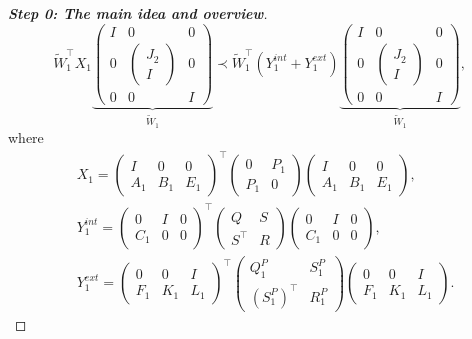 \documentclass[11pt,a4paper,oneside,DIV=12,headings=small]{scrartcl}
\theoremstyle{plain}
\begin{document}
\begin{proof}[\textbf{Step 0: \textit{The main idea and overview}}]
\begin{equation}
\label{D1A}
\tilde{W}_1^\top
X_1
\underbrace{\begin{pmatrix} I & 0 & 0 \\ 0 & \begin{pmatrix} J_2 \\ I \end{pmatrix} & 0 \\ 0 & 0 & I \end{pmatrix}}_{\tilde{W}_1}\prec
\tilde{W}_1^\top
(Y_1^{int}+Y_1^{ext})
\underbrace{\begin{pmatrix} I & 0 & 0 \\ 0 & \begin{pmatrix} J_2 \\ I \end{pmatrix} & 0 \\ 0 & 0 & I \end{pmatrix}}_{\tilde{W}_1}, 
\end{equation}
where
\begin{align}
&X_1= \begin{pmatrix} I & 0  & 0 \\ A_1 & B_1 & E_1  \end{pmatrix}^\top
\begin{pmatrix} 0 & P_1 \\ P_1 & 0 \end{pmatrix} 
\begin{pmatrix} I & 0  & 0 \\ A_1 & B_1 & E_1  \end{pmatrix},\\
&Y_1^{int}=\begin{pmatrix} 0 & I & 0 \\ C_1 & 0 & 0  \end{pmatrix}^\top
\begin{pmatrix} Q & S \\ S^\top & R \end{pmatrix}
\begin{pmatrix} 0 & I & 0 \\ C_1 & 0 & 0  \end{pmatrix}, \\
&Y_1^{ext}=\begin{pmatrix} 0 & 0 & I \\ F_1 & K_1 & L_1  \end{pmatrix}^\top
\begin{pmatrix} Q^P_1 & S^P_1 \\ (S^P_1)^\top & R^P_1 \end{pmatrix}
\begin{pmatrix} 0 & 0 & I \\ F_1 & K_1 & L_1  \end{pmatrix}.
\end{align}


\end{proof}
\end{document}
